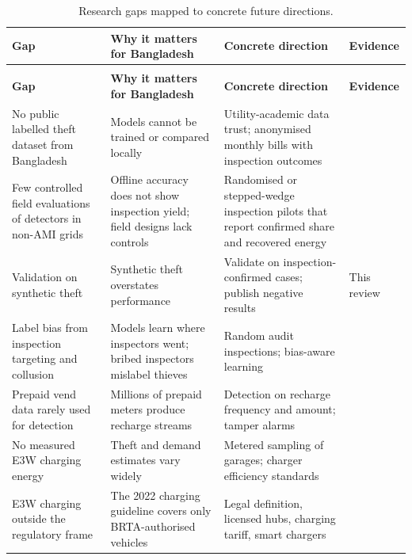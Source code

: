 \begingroup
\footnotesize
\renewcommand{\arraystretch}{1.12}
\setlength{\tabcolsep}{3pt}
\begin{xltabular}{\textwidth}{>{\raggedright\arraybackslash{}\hsize}X>{\raggedright\arraybackslash{}\hsize}X>{\raggedright\arraybackslash{}\hsize}X>{\raggedright\arraybackslash{}\hsize}X}
\caption{Research gaps mapped to concrete future directions.}\label{tab:t9} \\
\toprule
\textbf{Gap} & \textbf{Why it matters for Bangladesh} & \textbf{Concrete direction} & \textbf{Evidence} \\
\midrule
\endfirsthead
{} \\
\toprule
\textbf{Gap} & \textbf{Why it matters for Bangladesh} & \textbf{Concrete direction} & \textbf{Evidence} \\
\midrule
\endhead
\bottomrule
\endlastfoot
No public labelled theft dataset from Bangladesh & Models cannot be trained or compared locally & Utility-academic data trust; anonymised monthly bills with inspection outcomes & \citealp{ahammad2023electricity,glauner2017challenge} \\
Few controlled field evaluations of detectors in non-AMI grids & Offline accuracy does not show inspection yield; field designs lack controls & Randomised or stepped-wedge inspection pilots that report confirmed share and recovered energy & \citealp{haramaini2026hybrid,guerrero2018non,gusmao2020customer} \\
Validation on synthetic theft & Synthetic theft overstates performance & Validate on inspection-confirmed cases; publish negative results & This review \\
Label bias from inspection targeting and collusion & Models learn where inspectors went; bribed inspectors mislabel thieves & Random audit inspections; bias-aware learning & \citealp{glauner2017is,glauner2017challenge,lovei2000costs} \\
Prepaid vend data rarely used for detection & Millions of prepaid meters produce recharge streams & Detection on recharge frequency and amount; tamper alarms & \citealp{ahammad2023electricity,bss2025pdb,bss2025dpdc} \\
No measured E3W charging energy & Theft and demand estimates vary widely & Metered sampling of garages; charger efficiency standards & \citealp{islam2025banglatesla,mahmud2025integrating} \\
E3W charging outside the regulatory frame & The 2022 charging guideline covers only BRTA-authorised vehicles & Legal definition, licensed hubs, charging tariff, smart chargers & \citealp{powerdivision2022ev,awal2019bangladesh} \\

\end{xltabular}
